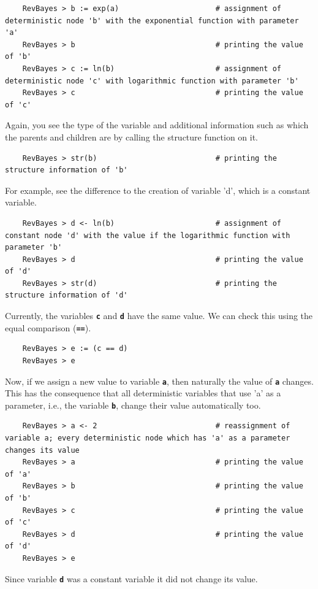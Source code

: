 \documentclass[11pt]{article}
\newcommand{\cl}[1]{{\texttt{\textbf{#1}}}}
\begin{document}
{\tt \begin{snugshade*}
\begin{lstlisting}    
    RevBayes > b := exp(a)                      # assignment of deterministic node 'b' with the exponential function with parameter 'a'
    RevBayes > b                                # printing the value of 'b'
    RevBayes > c := ln(b)                       # assignment of deterministic node 'c' with logarithmic function with parameter 'b'
    RevBayes > c                                # printing the value of 'c'
\end{lstlisting}
\end{snugshade*}}
Again, you see the type of the variable and additional information such as which the parents and children are by calling the structure function on it.
{\tt \begin{snugshade*}
\begin{lstlisting}    
    RevBayes > str(b)                           # printing the structure information of 'b'
\end{lstlisting}
\end{snugshade*}}
For example, see the difference to the creation of variable 'd', which is a constant variable.
{\tt \begin{snugshade*}
\begin{lstlisting}    
    RevBayes > d <- ln(b)                       # assignment of constant node 'd' with the value if the logarithmic function with parameter 'b'
    RevBayes > d                                # printing the value of 'd'
    RevBayes > str(d)                           # printing the structure information of 'd'
\end{lstlisting}
\end{snugshade*}}
Currently, the variables \cl{c} and \cl{d} have the same value. 
We can check this using the equal comparison (\cl{==}).
{\tt \begin{snugshade*}
\begin{lstlisting}    
    RevBayes > e := (c == d)			
    RevBayes > e
\end{lstlisting}
\end{snugshade*}}
Now, if we assign a new value to variable \cl{a}, then naturally the value of \cl{a} changes. 
This has the consequence that all deterministic variables that use 'a' as a parameter, i.e., the variable \cl{b}, change their value automatically too.
{\tt \begin{snugshade*}
\begin{lstlisting}    
    RevBayes > a <- 2                           # reassignment of variable a; every deterministic node which has 'a' as a parameter changes its value
    RevBayes > a                                # printing the value of 'a'
    RevBayes > b                                # printing the value of 'b'
    RevBayes > c                                # printing the value of 'c'
    RevBayes > d                                # printing the value of 'd'
    RevBayes > e
\end{lstlisting}
\end{snugshade*}}
Since variable \cl{d} was a constant variable it did not change its value. 
\end{document}
